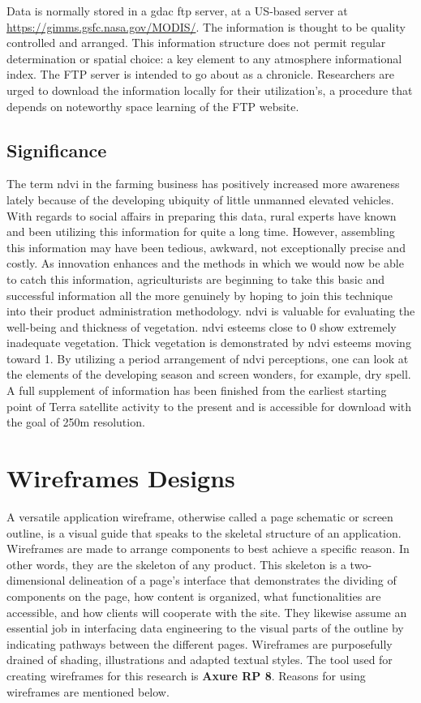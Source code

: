 Data is normally stored in a \gls{gdac} \gls{ftp} server, at a US-based server at \url{https://gimms.gsfc.nasa.gov/MODIS/}. The information is thought to be quality controlled and arranged. This information structure does not permit regular determination or spatial choice: a key element to any atmosphere informational index. The FTP server is intended to go about as a chronicle. Researchers are urged to download the information locally for their utilization's, a procedure that depends on noteworthy space learning of the FTP website.

\subsection{Significance}

The term \gls{ndvi} in the farming business has positively increased more awareness lately because of the developing ubiquity of little unmanned elevated vehicles. With regards to social affairs in preparing this data, rural experts have known and been utilizing this information for quite a long time. However, assembling this information may have been tedious, awkward, not exceptionally precise and costly. As innovation enhances and the methods in which we would now be able to catch this information, agriculturists are beginning to take this basic and successful information all the more genuinely by hoping to join this technique into their product administration methodology. 
\gls{ndvi} is valuable for evaluating the well-being and thickness of vegetation. \gls{ndvi} esteems close to 0 show extremely inadequate vegetation. Thick vegetation is demonstrated by \gls{ndvi} esteems moving toward 1. By utilizing a period arrangement of \gls{ndvi} perceptions, one can look at the elements of the developing season and screen wonders, for example, dry spell. A full supplement of information has been finished from the earliest starting point of Terra satellite activity to the present and is accessible for download with the goal of 250m resolution.

\section{Wireframes Designs}

A versatile application wireframe, otherwise called a page schematic or screen outline, is a visual guide that speaks to the skeletal structure of an application. Wireframes are made to arrange components to best achieve a specific reason. In other words, they are the skeleton of any product. This skeleton is a two-dimensional delineation of a page's interface that demonstrates the dividing of components on the page, how content is organized, what functionalities are accessible, and how clients will cooperate with the site. They likewise assume an essential job in interfacing data engineering to the visual parts of the outline by indicating pathways between the different pages. Wireframes are purposefully drained of shading, illustrations and adapted textual styles. The tool used for creating wireframes for this research is \textbf{Axure RP 8}. Reasons for using wireframes are mentioned below.

